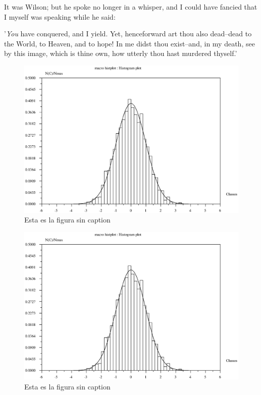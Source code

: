 \documentclass[12pt]{article}
\begin{document}
     It was Wilson; but he spoke no longer in a whisper, and I
could have fancied that I myself was speaking while he said:

     '\emph{You} have conquered, and I yield.  Yet, henceforward art
thou also dead--dead to the World, to Heaven, and to hope!  In me
didst thou exist--and, in my death, see by this image, which is
thine own, how utterly thou hast murdered thyself.'

\begin{figure}[htbp]
  \makeatletter
  \let\oldcaption\@makecaption
  \long{}

  \centering
    \includegraphics[width=.9\textwidth]{dummy-plot.eps}
    \caption{Esta es la figura sin caption}
    \label{fig:Hola}

  \let\@makecaption\oldcaption
  \makeatother
\end{figure}

\makeatletter
\newcommand\emptycaption[1]{%
  \let\oldcaption\@makecaption
  \long\def\@makecaption##1##2{\vskip \abovecaptionskip 
    \centering ##1
    \vskip\belowcaptionskip}
  \caption[#1]{#1}
  \let\@makecaption\oldcaption}
\makeatother

\begin{figure}[htbp]
  \centering
  \includegraphics[width=.9\textwidth]{dummy-plot.eps}
  \emptycaption{Esta es la figura sin caption}
  \label{fig:Holabis}
\end{figure}
\end{document}
